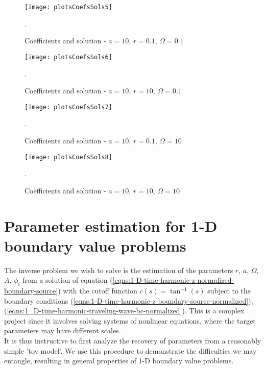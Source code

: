 \documentclass[12pt,twoside]{report}
\begin{document}
\begin{figure} 
\begin{center}
\texttt{[image: plotsCoefsSols5]}
\end{center}
\caption {Coefficients and solution - $a = 10$, $r = 0.1$, $\Omega = 0.1$}.

\label{fig:atanCoefsPlots5}
\end{figure}

\begin{figure} 
\begin{center}
\texttt{[image: plotsCoefsSols6]}
\end{center}
\caption {Coefficients and solution - $a = 10$, $r = 10$, $\Omega = 0.1$}.

\label{fig:atanCoefsPlots6}
\end{figure}

\begin{figure} 
\begin{center}
\texttt{[image: plotsCoefsSols7]}
\end{center}
\caption {Coefficients and solution - $a = 10$, $r = 0.1$, $\Omega = 10$}.

\label{fig:atanCoefsPlots7}
\end{figure}

\begin{figure} 
\begin{center}
\texttt{[image: plotsCoefsSols8]}
\end{center}
\caption {Coefficients and solution - $a = 10$, $r = 10$, $\Omega = 10$}.

\label{fig:atanCoefsPlots8}
\end{figure}



\newpage

\chapter{Parameter estimation for 1-D boundary value problems}
The inverse problem we wish to solve is the estimation of the parameters $r$, $a$, $\Omega$, $A$, $\phi_i$ from a solution of equation (\ref{eqns:1-D-time-harmonic-z-normalized-boundary-source}) with the cutoff function $c(s) = \tan^{-1}(s)$ subject to the boundary conditions (\ref{eqns:1-D-time-harmonic-z-boundary-source-normalized}), (\ref{eqns:1_D-time-harmonic-traveling-wave-bc-normalized}). This is a complex project since it involves solving systems of nonlinear equations, where the target parameters may have different scales.\\
It is thus instructive to first analyze the recovery of parameters from  a reasonably simple 'toy model'. We use this procedure to demonstrate the difficulties we may entangle, resulting in general properties of 1-D boundary value problems.
\end{document}
